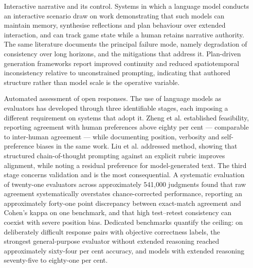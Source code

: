 Interactive narrative and its control. Systems in which a language model conducts an interactive scenario draw on work demonstrating that such models can maintain memory, synthesise reflections and plan behaviour over extended interaction\cite{r53}, and can track game state while a human retains narrative authority\cite{r54,r55}. The same literature documents the principal failure mode, namely degradation of consistency over long horizons, and the mitigations that address it. Plan-driven generation frameworks report improved continuity and reduced spatiotemporal inconsistency relative to unconstrained prompting\cite{r56}, indicating that authored structure rather than model scale is the operative variable.

Automated assessment of open responses. The use of language models as evaluators has developed through three identifiable stages, each imposing a different requirement on systems that adopt it. Zheng et al.\cite{r57} established feasibility, reporting agreement with human preferences above eighty per cent --- comparable to inter-human agreement --- while documenting position, verbosity and self-\allowbreak{}preference biases in the same work. Liu et al.\cite{r58} addressed method, showing that structured chain-\allowbreak{}of-\allowbreak{}thought prompting against an explicit rubric improves alignment, while noting a residual preference for model-\allowbreak{}generated text. The third stage concerns validation and is the most consequential. A systematic evaluation of twenty-one evaluators across approximately 541,000 judgments\cite{r59} found that raw agreement systematically overstates chance-\allowbreak{}corrected performance, reporting an approximately forty-one point discrepancy between exact-match agreement and Cohen's kappa on one benchmark, and that high test--retest consistency can coexist with severe position bias. Dedicated benchmarks quantify the ceiling: on deliberately difficult response pairs with objective correctness labels, the strongest general-\allowbreak{}purpose evaluator without extended reasoning reached approximately sixty-four per cent accuracy, and models with extended reasoning seventy-\allowbreak{}five to eighty-one per cent\cite{r60}.

